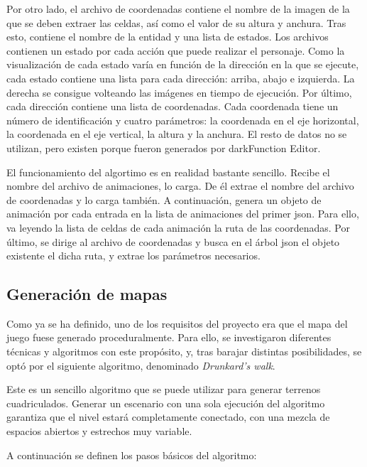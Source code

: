 		Por otro lado, el archivo de coordenadas contiene el nombre de la imagen de la que se deben extraer las celdas, así como el valor de su altura y anchura. Tras esto, contiene el nombre de la entidad y una lista de estados. Los archivos contienen un estado por cada acción que puede realizar el personaje. Como la visualización de cada estado varía en función de la dirección en la que se ejecute, cada estado contiene una lista para cada dirección: arriba, abajo e izquierda. La derecha se consigue volteando las imágenes en tiempo de ejecución. Por último, cada dirección contiene una lista de coordenadas. Cada coordenada tiene un número de identificación y cuatro parámetros: la coordenada en el eje horizontal, la coordenada en el eje vertical, la altura y la anchura. El resto de datos no se utilizan, pero existen porque fueron generados por darkFunction Editor.

		El funcionamiento del algortimo es en realidad bastante sencillo. Recibe el nombre del archivo de animaciones, lo carga. De él extrae el nombre del archivo de coordenadas y lo carga también. A continuación, genera un objeto de animación por cada entrada en la lista de animaciones del primer \acrshort{json}. Para ello, va leyendo la lista de celdas de cada animación la ruta de las coordenadas. Por último, se dirige al archivo de coordenadas y busca en el árbol \acrshort{json} el objeto existente el dicha ruta, y extrae los parámetros necesarios.

	\subsection{Generación de mapas}

		Como ya se ha definido, uno de los requisitos del proyecto era que el mapa del juego fuese generado proceduralmente. Para ello, se investigaron diferentes técnicas y algoritmos con este propósito, y, tras barajar distintas posibilidades, se optó por el siguiente algoritmo, denominado \textit{Drunkard's walk}.

		Este es un sencillo algoritmo que se puede utilizar para generar terrenos cuadriculados. Generar un escenario con una sola ejecución del algoritmo garantiza que el nivel estará completamente conectado, con una mezcla de espacios abiertos y estrechos muy variable.

		A continuación se definen los pasos básicos del algoritmo:

